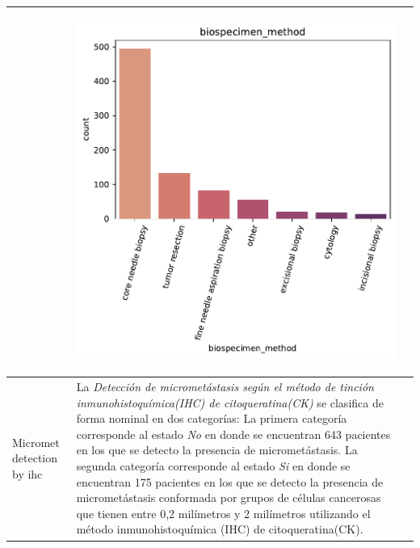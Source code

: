 \begin{table}[!htb]
\begin{threeparttable}
\begin{tabular}{p{2.5cm} p{7.5cm} p{6.5cm}}
			& \begin{center}\includegraphics[width=1\linewidth]{NOTEBOOK/IMAGENES_DESCRIPTIVAS/27_biospecimen_method}\end{center}
			\\ \hline
			Micromet detection by ihc 
			& La \textit{Detección de micrometástasis según el método de tinción inmunohistoquímica(IHC) de citoqueratina(CK)} se clasifica de forma nominal en dos categorías: La primera categoría corresponde al estado \textit{No} en donde se encuentran 643 pacientes en los que se detecto la presencia de micrometástasis. La segunda categoría corresponde al estado \textit{Si} en donde se encuentran 175  pacientes en los que se detecto la presencia de micrometástasis conformada por grupos de células cancerosas que tienen entre 0,2 milímetros y 2 milímetros  utilizando el método inmunohistoquímica (IHC) de citoqueratina(CK).

\end{tabular}
\end{threeparttable}
\end{table}
